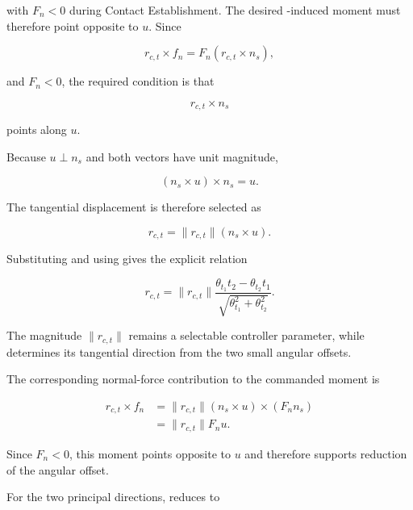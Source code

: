 with \mbox{\(F_n<0\)} during Contact Establishment. The desired
-induced moment must therefore point opposite to \mbox{\(u\)}. Since

\[
r_{c,t}\times f_n=F_n(r_{c,t}\times n_s),
\]

and \mbox{\(F_n<0\)}, the required condition is that

\[
r_{c,t}\times n_s
\]

points along \mbox{\(u\)}.

Because \mbox{\(u\perp n_s\)} and both vectors have unit magnitude,

\[
(n_s\times u)\times n_s=u.
\]

The tangential  displacement is therefore selected as

\begin{equation}
r_{c,t}
=
\lVert r_{c,t}\rVert(n_s\times u).
\label{eq:general_compliance_lever_selection}
\end{equation}

Substituting \mbox{} and using
\mbox{} gives the explicit
relation

\begin{equation}
r_{c,t}
=
\lVert r_{c,t}\rVert
\frac{\theta_{t_1}t_2-\theta_{t_2}t_1}
     {\sqrt{\theta_{t_1}^2+\theta_{t_2}^2}}.
\label{eq:compliance_lever_selection_components}
\end{equation}

The magnitude \mbox{\(\lVert r_{c,t}\rVert\)} remains a selectable controller
parameter, while \mbox{}
determines its tangential direction from the two small angular offsets.

The corresponding normal-force contribution to the commanded moment is

\begin{equation}
\begin{aligned}
r_{c,t}\times f_n
&=
\lVert r_{c,t}\rVert(n_s\times u)\times(F_nn_s)\\
&=
\lVert r_{c,t}\rVert F_nu.
\end{aligned}
\label{eq:general_compliance_lever_moment}
\end{equation}

Since \mbox{\(F_n<0\)}, this moment points opposite to \mbox{\(u\)} and
therefore supports reduction of the angular offset.

For the two principal directions,
\mbox{} reduces to

